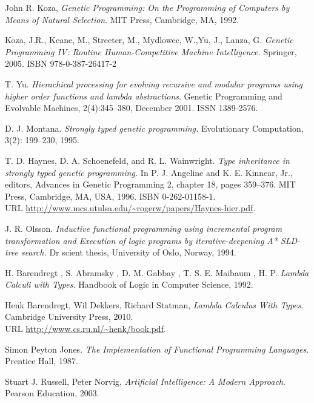 \documentclass[12pt,a4paper]{report}
\begin{document}
\begin{thebibliography}{9}




  John R. Koza,
  \emph{Genetic Programming: On the Programming of Computers by Means of Natural Selection}.
  MIT Press, Cambridge, MA,
  1992. 


  Koza, J.R., Keane, M., Streeter, M., Mydlowec, W.,Yu, J., Lanza, G. 
  \emph{Genetic Programming IV: Routine Human-Competitive Machine Intelligence.} 
  Springer, 2005. ISBN 978-0-387-26417-2 


  T. Yu. 
  \emph{Hierachical processing for evolving recursive and modular 
        programs using higher order functions and lambda abstractions}. 
  Genetic Programming and Evolvable Machines,
  2(4):345–380, December 2001. ISSN 1389-2576.



D. J. Montana. 
\emph{Strongly typed genetic programming.} 
Evolutionary Computation, 3(2): 199–230, 1995.


T. D. Haynes, D. A. Schoenefeld, and R. L. Wainwright. 
\emph{Type inheritance in strongly typed genetic programming.} 
In P. J. Angeline and K. E. Kinnear, Jr., editors, Advances
in Genetic Programming 2, chapter 18, pages 359–376.
MIT Press, Cambridge, MA, USA, 1996. ISBN 0-262-01158-1.\\ 
URL 
\url{http://www.mcs.utulsa.edu/~rogerw/papers/Haynes-hier.pdf}.



J. R. Olsson. 
\emph{Inductive functional programming using incremental program 
transformation and Execution of logic programs by 
iterative-deepening A* SLD-tree search.} 
Dr scient thesis, University of Oslo, Norway, 1994.

H. Barendregt , S. Abramsky , D. M. Gabbay , T. S. E. Maibaum , H.  P.
\emph{Lambda Calculi with Types.} 
Handbook of Logic in Computer Science, 1992. 


  Henk Barendregt, Wil Dekkers, Richard Statman,
  \emph{Lambda Calculus With Types}.
  Cambridge University Press,
  2010. \\
  URL \url{http://www.cs.ru.nl/~henk/book.pdf}.

Simon Peyton Jones. 
\emph{The Implementation of Functional Programming Languages}. 
Prentice Hall, 1987.



	Stuart J. Russell, Peter Norvig,
	\emph{Artificial Intelligence: A Modern Approach}.
	Pearson Education,
	2003. 

\end{thebibliography}

	
	
\end{document}
